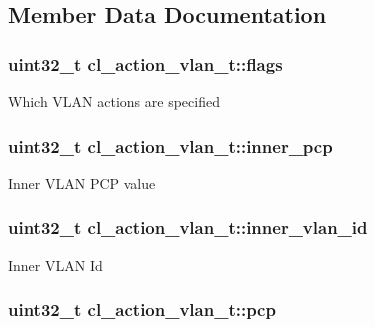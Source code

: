 \subsection{Member Data Documentation}
\hypertarget{structcl__action__vlan__t_ad947b4c233c844235c425401d48f90ab}{
\subsubsection[{flags}]{\setlength{\rightskip}{0pt plus 5cm}uint32\-\_\-t cl\-\_\-action\-\_\-vlan\-\_\-t\-::flags}}\label{structcl__action__vlan__t_ad947b4c233c844235c425401d48f90ab}
Which V\-L\-A\-N actions are specified \hypertarget{structcl__action__vlan__t_a9f3ffb7da0987a4e8080bb5cc3bf8122}{
\subsubsection[{inner\-\_\-pcp}]{\setlength{\rightskip}{0pt plus 5cm}uint32\-\_\-t cl\-\_\-action\-\_\-vlan\-\_\-t\-::inner\-\_\-pcp}}\label{structcl__action__vlan__t_a9f3ffb7da0987a4e8080bb5cc3bf8122}
Inner V\-L\-A\-N P\-C\-P value \hypertarget{structcl__action__vlan__t_a2dda44d51a174c88c1a5200c7de1f3d1}{
\subsubsection[{inner\-\_\-vlan\-\_\-id}]{\setlength{\rightskip}{0pt plus 5cm}uint32\-\_\-t cl\-\_\-action\-\_\-vlan\-\_\-t\-::inner\-\_\-vlan\-\_\-id}}\label{structcl__action__vlan__t_a2dda44d51a174c88c1a5200c7de1f3d1}
Inner V\-L\-A\-N Id \hypertarget{structcl__action__vlan__t_a544d3fe82906bb8ca55ed3a5122b9fa4}{
\subsubsection[{pcp}]{\setlength{\rightskip}{0pt plus 5cm}uint32\-\_\-t cl\-\_\-action\-\_\-vlan\-\_\-t\-::pcp}}\label{structcl__action__vlan__t_a544d3fe82906bb8ca55ed3a5122b9fa4}
